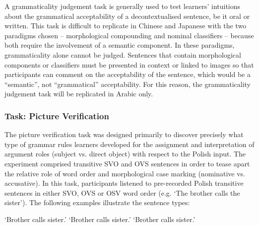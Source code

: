 \documentclass[output=paper,colorlinks,citecolor=brown,modfonts,nonflat]{../langscibook}
\begin{document}
A grammaticality judgement task is generally used to test learners’ intuitions about the grammatical acceptability of a decontextualised sentence, be it oral or written. This task is difficult to replicate in Chinese and Japanese with the two paradigms chosen – morphological compounding and nominal classifiers – because both require the involvement of a semantic component. In these paradigms, grammaticality alone cannot be judged. Sentences that contain morphological components or classifiers must be presented in context or linked to images so that participants can comment on the acceptability of the sentence, which would be a “semantic”, not “grammatical” acceptability. For this reason, the grammaticality judgement task will be replicated in Arabic only. 

\subsubsection{Task: Picture Verification}

The picture verification task was designed primarily to discover precisely what type of grammar rules learners developed for the assignment and interpretation of argument roles (subject vs. direct object) with respect to the Polish input. The experiment comprised transitive SVO and OVS sentences in order to tease apart the relative role of word order and morphological case marking (nominative vs. accusative). In this task, participants listened to pre-recorded Polish transitive sentences in either SVO, OVS or OSV word order (e.g. `The brother calls the sister'). The following examples illustrate the sentence types:

\ea%
    \label{ex:watorek:3}
        \glt    ‘Brother calls sister.’
        \glt    ‘Brother calls sister.’
        \glt    ‘Brother calls sister.’
    \z
\z
\end{document}
